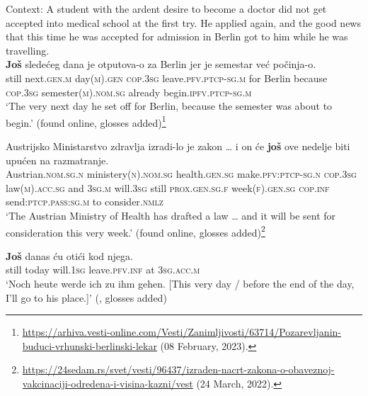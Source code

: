 \begin{exe}
	\ex\label{exAppendixSerbocroatianTemporalFrameAdverbial1}
Context: A student with the ardent desire to become a doctor did not get accepted into medical school at the first try. He applied again, and the good news that this time he was accepted for admission in Berlin got to him while he was travelling.\\
	\gll \textbf{Još} sledećeg dana je otputova-o za Berlin jer je semestar već počinja-o.\\
 	 still next.\textsc{gen}.\textsc{m} day(\textsc{m}).\textsc{gen} \textsc{cop}.3\textsc{sg} leave.\textsc{pfv}.\textsc{ptcp}-\textsc{sg}.\textsc{m} for Berlin because \textsc{cop}.3\textsc{sg} semester(\textsc{m}).\textsc{nom}.\textsc{sg} already begin.\textsc{ipfv}.\textsc{ptcp}-\textsc{sg}.\textsc{m}\\
	 \glt  \lq The very next day he set off for Berlin, because the semester was about to begin.' (found online, glosses added)\footnote{\url{https://arhiva.vesti-online.com/Vesti/Zanimljivosti/63714/Pozarevljanin-buduci-vrhunski-berlinski-lekar} (08 February, 2023).}

	\ex\label{exAppendixSerbocroatianTemporalFrameAdverbial2}	
	\gll Austrijsko Ministarstvo zdravlja izradi-lo je zakon … i on će \textbf{još} ove nedelje biti upućen na razmatranje.\\
Austrian.\textsc{nom}.\textsc{sg}.\textsc{n} ministery(\textsc{n}).\textsc{nom}.\textsc{sg} health.\textsc{gen}.\textsc{sg} make.\textsc{pfv}:\textsc{ptcp}-\textsc{sg}.\textsc{n} \textsc{cop}.3\textsc{sg} law(\textsc{m}).\textsc{acc}.\textsc{sg} {} and 3\textsc{sg}.\textsc{m} will.3\textsc{sg} still \textsc{prox}.\textsc{gen}.\textsc{sg}.\textsc{f} week(\textsc{f}).\textsc{gen}.\textsc{sg} \textsc{cop}.\textsc{inf} send:\textsc{ptcp}.\textsc{pass}:\textsc{sg}.\textsc{m} to consider.\textsc{nmlz}\\
	\glt \lq The Austrian Ministry of Health has drafted a law … and it will be sent for consideration this very week.'
	(found online, glosses added)\footnote{\url{https://24sedam.rs/svet/vesti/96437/izraden-nacrt-zakona-o-obaveznoj-vakcinaciji-odredena-i-visina-kazni/vest} (24 March, 2022).}

	\ex\label{exAppendixSerbocroatianTemporalFrameAdverbial3}
	\gll \textbf{Još} danas ću otići kod njega.\\
	still today will.1\textsc{sg} leave.\textsc{pfv}.\textsc{inf} at 3\textsc{sg}.\textsc{acc}.\textsc{m}\\
	\glt \lq Noch heute werde ich zu ihm gehen. [This very day / before the end of the day, I'll go to his place.]\rq{ }(\cite[31]{Buchholz1991}, glosses added)
	

\end{exe}
